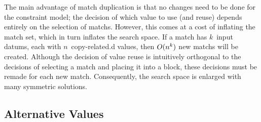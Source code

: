 The main advantage of \gls{match duplication} is that no changes need to be done
for the \gls{constraint model}; the decision of which value to use (and reuse)
depends entirely on the selection of \glspl{match}.
%
However, this comes at a cost of inflating the \gls{match set}, which in turn
inflates the \gls{search space}.
%
If a \gls{match} has $k$~\glspl{input datum}, each with $n$~\gls{copy-related.d}
values, then $O(n^k)$ new \glspl{match} will be created.
%
Although the decision of \gls{value reuse} is intuitively orthogonal to the
decisions of selecting a \gls{match} and placing it into a \gls{block}, these
decisions must be remade for each new \gls{match}.
%
Consequently, the \gls{search space} is enlarged with many symmetric
\glspl{solution}.


\subsection{Alternative Values}

